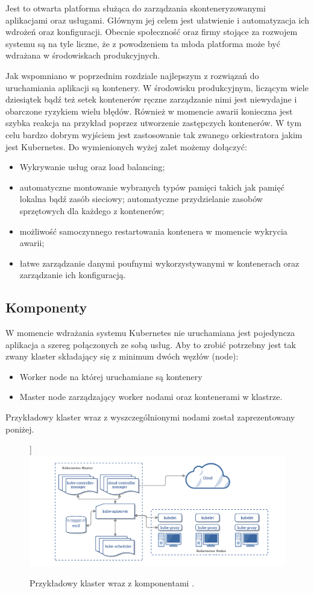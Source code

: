 \documentclass[pl,final,oneside]{mgr} %
\begin{document}
Jest to otwarta platforma służąca do zarządzania skonteneryzowanymi aplikacjami oraz usługami. Głównym jej celem jest ułatwienie i automatyzacja ich wdrożeń oraz konfiguracji. Obecnie społeczność oraz firmy stojące za rozwojem systemu są na tyle liczne, że z powodzeniem ta młoda platforma może być wdrażana w środowiskach produkcyjnych.

Jak wspomniano w poprzednim rozdziale najlepszym z rozwiązań do uruchamiania aplikacji są kontenery. W środowisku produkcyjnym, liczącym wiele dziesiątek bądź też setek kontenerów    ręczne zarządzanie nimi jest niewydajne i obarczone ryzykiem wielu błędów. Również w momencie awarii konieczna jest szybka reakcja na przykład poprzez utworzenie zastępczych kontenerów. W tym celu bardzo dobrym wyjściem jest zastosowanie tak zwanego orkiestratora jakim jest Kubernetes. Do wymienionych wyżej zalet możemy dołączyć:

\begin{itemize}
	\item Wykrywanie usług oraz load balancing;
	\item automatyczne montowanie wybranych typów pamięci takich jak pamięć lokalna bądź zasób sieciowy;
automatyczne przydzielanie zasobów sprzętowych dla każdego z kontenerów;
	\item możliwość samoczynnego restartowania kontenera w momencie wykrycia awarii;
	\item łatwe zarządzanie danymi poufnymi wykorzystywanymi w kontenerach oraz zarządzanie ich konfiguracją.
\end{itemize}

\subsection{Komponenty}
W momencie wdrażania systemu Kubernetes nie uruchamiana jest pojedyncza aplikacja a szereg połączonych ze sobą usług. Aby to zrobić potrzebny jest tak zwany klaster składający się z minimum dwóch węzłów (node):
\begin{itemize}
	\item Worker node na której uruchamiane są kontenery 
	\item Master node zarządzający worker nodami oraz kontenerami w klastrze.
\end{itemize}
Przykładowy klaster wraz z wyszczególnionymi nodami został zaprezentowany poniżej.
\begin{figure}[h!]]
	\centering
	\includegraphics[width=1\linewidth]{images/components-of-kubernetes}
	\caption{Przykładowy klaster wraz z komponentami \cite{kube_doku}.}
	\label{fig:components-of-kubernetes}
\end{figure}
\end{document}
